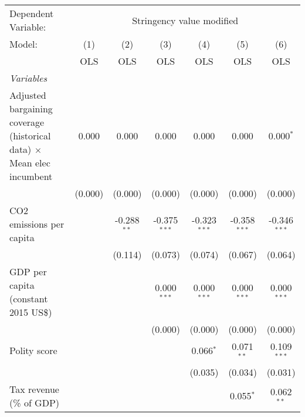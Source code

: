 
\begingroup
\centering
\begin{tabular}{lcccccc}
   \toprule
   Dependent Variable: & \multicolumn{6}{c}{Stringency value modified}\\
   Model:                                                                       & (1)     & (2)           & (3)            & (4)            & (5)            & (6)\\  
                                                                                &  OLS    & OLS           & OLS            & OLS            & OLS            & OLS\\  
   \midrule
   \emph{Variables}\\
   Adjusted bargaining coverage (historical data) $\times$ Mean elec incumbent  & 0.000   & 0.000         & 0.000          & 0.000          & 0.000          & 0.000$^{*}$\\   
                                                                                & (0.000) & (0.000)       & (0.000)        & (0.000)        & (0.000)        & (0.000)\\   
   CO2 emissions per capita                                                     &         & -0.288$^{**}$ & -0.375$^{***}$ & -0.323$^{***}$ & -0.358$^{***}$ & -0.346$^{***}$\\   
                                                                                &         & (0.114)       & (0.073)        & (0.074)        & (0.067)        & (0.064)\\   
   GDP per capita (constant 2015 US\$)                                          &         &               & 0.000$^{***}$  & 0.000$^{***}$  & 0.000$^{***}$  & 0.000$^{***}$\\   
                                                                                &         &               & (0.000)        & (0.000)        & (0.000)        & (0.000)\\   
   Polity score                                                                 &         &               &                & 0.066$^{*}$    & 0.071$^{**}$   & 0.109$^{***}$\\   
                                                                                &         &               &                & (0.035)        & (0.034)        & (0.031)\\   
   Tax revenue (\% of GDP)                                                      &         &               &                &                & 0.055$^{*}$    & 0.062$^{**}$\\   

\end{tabular}
